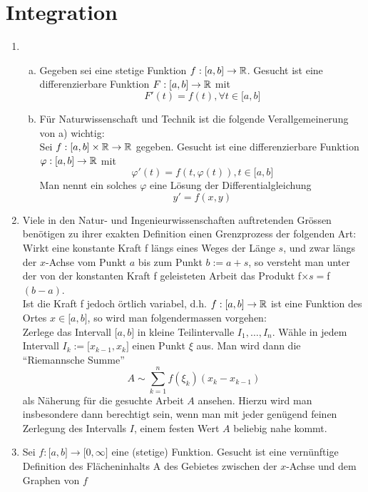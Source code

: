 \chapter{Integration}

\begin{enumerate}[\indent I)]
\item \begin{enumerate}[a)]
\item Gegeben sei eine stetige Funktion $f : \lbrack a,b\rbrack \to \R$. Gesucht ist eine differenzierbare Funktion $F: \lbrack a,b\rbrack \to \R$ mit \[F'(t)=f(t), \forall t \in \lbrack a,b \rbrack\]
\item Für Naturwissenschaft und Technik ist die folgende Verallgemeinerung von a) wichtig:\\
Sei $f:\lbrack a,b\rbrack \times \R \to \R$ gegeben. Gesucht ist eine differenzierbare Funktion $\varphi : \lbrack a,b\rbrack \to \R$ mit \[\varphi ' (t)=f(t,\varphi (t)), t\in \lbrack a,b \rbrack\] Man nennt ein solches $\varphi$ eine Lösung der Differentialgleichung \[y'=f(x,y)\]
\end{enumerate}
\item Viele in den Natur- und Ingenieurwissenschaften auftretenden Grössen benötigen zu ihrer exakten Definition einen Grenzprozess der folgenden Art: \\
Wirkt eine konstante Kraft f längs eines Weges der Länge $s$, und zwar längs der $x$-Achse vom Punkt $a$ bis zum Punkt $b:=a+s$, so versteht man unter der von der konstanten Kraft f geleisteten Arbeit das Produkt f$\times s=$f$(b-a)$. \\
Ist die Kraft f jedoch örtlich variabel, d.h. $f:\lbrack a,b\rbrack \to \R$ ist eine Funktion des Ortes $x \in \lbrack a,b\rbrack$, so wird man folgendermassen vorgehen:\\

Zerlege das Intervall $\lbrack a,b\rbrack$ in kleine Teilintervalle $I_{1},\dots, I_{n}$. Wähle in jedem Intervall $I_{k}:=\lbrack x_{k-1}, x_{k}\rbrack$ einen Punkt $\xi$ aus. Man wird dann die ``Riemannsche Summe'' \[A \sim  \sum\limits_{k = 1}^n {f({\xi_k})({x_k} - {x_{k - 1}})} \]  als Näherung für die gesuchte Arbeit $A$ ansehen. Hierzu wird man insbesondere dann berechtigt sein, wenn man mit jeder genügend feinen Zerlegung des Intervalls $I$, einem festen Wert $A$ beliebig nahe kommt.

\item Sei $f: \lbrack a,b\rbrack \to \lbrack 0,\infty\rbrack$ eine (stetige) Funktion. Gesucht ist eine vernünftige Definition des Flächeninhalts A des Gebietes zwischen der $x$-Achse und dem Graphen von $f$
\begin{center}
\begin{tikzpicture}



\end{tikzpicture}
\end{center}
\end{enumerate}
